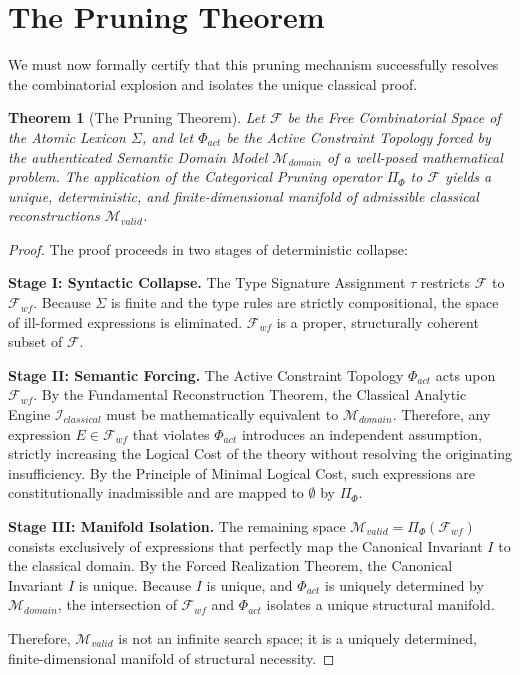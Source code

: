 \documentclass[12pt,openany]{extbook}
\theoremstyle{plain}
\newtheorem{theorem}{Theorem}[chapter]
\theoremstyle{definition}
\begin{document}
\section{The Pruning Theorem}

We must now formally certify that this pruning mechanism successfully resolves the combinatorial explosion and isolates the unique classical proof.

\begin{theorem}[The Pruning Theorem]
Let $\mathcal{F}$ be the Free Combinatorial Space of the Atomic Lexicon $\Sigma$, and let $\Phi_{act}$ be the Active Constraint Topology forced by the authenticated Semantic Domain Model $\mathcal{M}_{domain}$ of a well-posed mathematical problem. The application of the Categorical Pruning operator $\Pi_{\Phi}$ to $\mathcal{F}$ yields a unique, deterministic, and finite-dimensional manifold of admissible classical reconstructions $\mathcal{M}_{valid}$.
\end{theorem}

\begin{proof}
The proof proceeds in two stages of deterministic collapse:

\textbf{Stage I: Syntactic Collapse.} 
The Type Signature Assignment $\tau$ restricts $\mathcal{F}$ to $\mathcal{F}_{wf}$. Because $\Sigma$ is finite and the type rules are strictly compositional, the space of ill-formed expressions is eliminated. $\mathcal{F}_{wf}$ is a proper, structurally coherent subset of $\mathcal{F}$.

\textbf{Stage II: Semantic Forcing.} 
The Active Constraint Topology $\Phi_{act}$ acts upon $\mathcal{F}_{wf}$. By the Fundamental Reconstruction Theorem, the Classical Analytic Engine $\mathcal{I}_{classical}$ must be mathematically equivalent to $\mathcal{M}_{domain}$. Therefore, any expression $E \in \mathcal{F}_{wf}$ that violates $\Phi_{act}$ introduces an independent assumption, strictly increasing the Logical Cost of the theory without resolving the originating insufficiency. By the Principle of Minimal Logical Cost, such expressions are constitutionally inadmissible and are mapped to $\emptyset$ by $\Pi_{\Phi}$.

\textbf{Stage III: Manifold Isolation.}
The remaining space $\mathcal{M}_{valid} = \Pi_{\Phi}(\mathcal{F}_{wf})$ consists exclusively of expressions that perfectly map the Canonical Invariant $I$ to the classical domain. By the Forced Realization Theorem, the Canonical Invariant $I$ is unique. Because $I$ is unique, and $\Phi_{act}$ is uniquely determined by $\mathcal{M}_{domain}$, the intersection of $\mathcal{F}_{wf}$ and $\Phi_{act}$ isolates a unique structural manifold. 

Therefore, $\mathcal{M}_{valid}$ is not an infinite search space; it is a uniquely determined, finite-dimensional manifold of structural necessity.
\end{proof}
\end{document}
